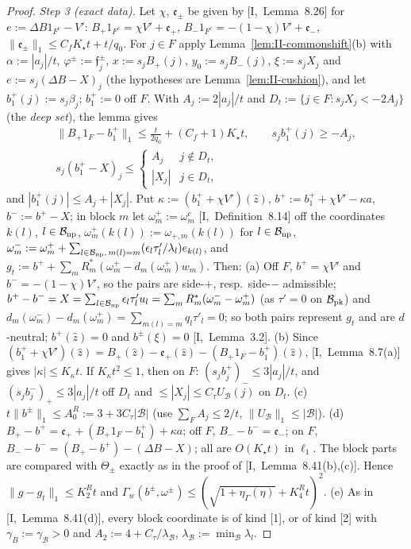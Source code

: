 \documentclass[10pt]{amsart}
\theoremstyle{definition}
\theoremstyle{remark}
\newcommand{\zh}{\hat z}
\begin{document}
\begin{proof}
\emph{Step 3 (exact data).}  Let $\chi$, $\mathfrak e_\pm$ be given by
[I,~Lemma~8.26] for $e:=\Delta B1_{F^c}-V'$: $B_+1_{F^c}=\chi V'+
\mathfrak e_+$, $B_-1_{F^c}=-(1-\chi)V'+\mathfrak e_-$, $\|\mathfrak e_\pm\|_1
\le C_fK_\star t+t/q_0$.  For $j\in F$ apply
Lemma~\ref{lem:II-commonshift}(b) with $\alpha:=|a_j|/t$,
$\varphi^\pm:=\mathfrak f^\pm_j$, $x:=s_jB_+(j)$, $y_0:=s_jB_-(j)$, $\xi:=s_jX_j$
and $e:=s_j(\Delta B-X)_j$ (the hypotheses are Lemma~\ref{lem:II-cushion}),
and let $b^+_1(j):=s_j\beta_j$; $b^+_1:=0$ off $F$.  With $A_j:=2|a_j|/t$ and
$D_t:=\{j\in F:s_jX_j<-2A_j\}$ (the \emph{deep set}), the lemma gives
\begin{gather*}
 \|B_+1_F-b^+_1\|_1\le\frac t{2q_0}+(C_f+1)K_\star t,\qquad s_jb^+_1(j)\ge-A_j,
 \\ s_j(b^+_1-X)_j\le\begin{cases}A_j&j\notin D_t,\\|X_j|&j\in D_t,
 \end{cases}
\end{gather*}
and $|b^+_1(j)|\le A_j+|X_j|$.  Put $\kappa:=(b^+_1+\chi V')(\zh)$,
$b^+:=b^+_1+\chi V'-\kappa a$, $b^-:=b^+-X$; in block $m$ let
$\omega^+_m:=\omega^c_m$ [I,~Definition~8.14] off the coordinates $k(l)$,
$l\in\mathcal B_{\rm np}$, $\omega^+_m(k(l)):=\omega_{+,m}(k(l))$ for
$l\in\mathcal B_{\rm np}$, $\omega^-_m:=\omega^+_m+\sum_{l\in\mathcal
B_{\rm np},\,m(l)=m}(\epsilon_l\tau'_l/\lambda_l)e_{k(l)}$, and
$g_t:=b^++\sum_mR_m^*(\omega^+_m-d_m(\omega^+_m)w_m)$.  Then:
(a) Off $F$, $b^+=\chi V'$ and $b^-=-(1-\chi)V'$, so the pairs are side-$+$,
resp.\ side-$-$ admissible; $b^+-b^-=X=\sum_{l\in\mathcal B_{\rm np}}
\epsilon_l\tau'_lu_l=\sum_mR_m^*(\omega^-_m-\omega^+_m)$ (as $\tau'=0$ on
$\mathcal B_{\rm pk}$) and $d_m(\omega^-_m)-d_m(\omega^+_m)=\sum_{m(l)=m}
q_l\tau'_l=0$; so both pairs represent $g_t$ and are $d$-neutral;
$b^+(\zh)=0$ and $b^\pm(\xi)=0$ [I,~Lemma~3.2].
(b) Since $(b^+_1+\chi V')(\zh)=B_+(\zh)-\mathfrak e_+(\zh)-(B_+1_F-b^+_1)(\zh)$,
[I,~Lemma~8.7(a)] gives $|\kappa|\le K_\kappa t$.  If $K_\kappa t^2\le1$, then on
$F$: $(s_jb^+_j)_-\le3|a_j|/t$, and $(s_jb^-_j)_+\le3|a_j|/t$ off $D_t$ and
$\le|X_j|\le C_\tau U_{\mathcal B}(j)$ on $D_t$.
(c) $t\|b^\pm\|_1\le A^R_0:=3+3C_\tau|\mathcal B|$ (use $\sum_FA_j\le2/t$,
$\|U_{\mathcal B}\|_1\le|\mathcal B|$).
(d) $B_+-b^+=\mathfrak e_++(B_+1_F-b^+_1)+\kappa a$; off $F$, $B_--b^-=
\mathfrak e_-$; on $F$, $B_--b^-=(B_+-b^+)-(\Delta B-X)$; all are
$O(K_\star t)$ in $\ell_1$.  The block parts are compared with
$\Theta_\pm$ exactly as in the proof of [I,~Lemma~8.41(b),(c)].  Hence
$\|g-g_t\|_1\le K^R_2t$ and $\Gamma_w(b^\pm,\omega^\pm)\le(\sqrt{1+
\eta_\Gamma(\eta)}+K^R_4t)^2$.
(e) As in [I,~Lemma~8.41(d)], every block coordinate is of kind [1], or of
kind [2] with $\gamma_B:=\gamma_{\mathcal B}>0$ and $A_2:=4+C_\tau/
\lambda_{\mathcal B}$, $\lambda_{\mathcal B}:=\min_{\mathcal B}\lambda_l$.


\end{proof}
\end{document}
